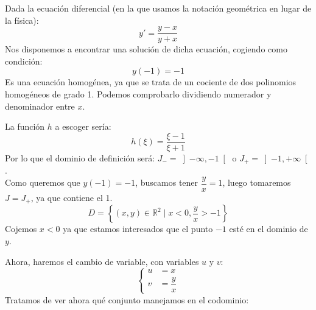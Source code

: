 \begin{ejemplo}
    Dada la ecuación diferencial (en la que usamos la notación geométrica en lugar de la física):
    \begin{equation*}
        y' = \dfrac{y-x}{y+x}
    \end{equation*}
    Nos disponemos a encontrar una solución de dicha ecuación, cogiendo como condición:
    \begin{equation*}
        y(-1) = -1
    \end{equation*}
    Es una ecuación homogénea, ya que se trata de un cociente de dos polinomios homogéneos de grado 1. Podemos comprobarlo dividiendo numerador y denominador entre $x$.

    La función $h$ a escoger sería:
    \begin{equation*}
        h(\xi) = \dfrac{\xi - 1}{\xi + 1}
    \end{equation*}
    Por lo que el dominio de definición será: $J_- = \left]-\infty, -1\right[$ o $J_+ = \left]-1, +\infty\right[$.\\
    Como queremos que $y(-1) = -1$, buscamos tener $\dfrac{y}{x} = 1$, luego tomaremos $J = J_+$, ya que contiene el 1.
    \begin{equation*}
        D = \left\{(x,y)\in \mathbb{R}^2 \mid x<0, \dfrac{y}{x}>-1\right\}
    \end{equation*}
    Cojemos $x<0$ ya que estamos interesados que el punto $-1$ esté en el dominio de $y$.

    Ahora, haremos el cambio de variable, con variables $u$ y $v$:
    \begin{equation*}
        \left\{\begin{array}{rl}
                u &= x \\
                v &= \dfrac{y}{x}
        \end{array}\right.
    \end{equation*}
    Tratamos de ver ahora qué conjunto manejamos en el codominio:

\begin{figure}[H]
\centering
{}
\end{figure}
\end{ejemplo}
